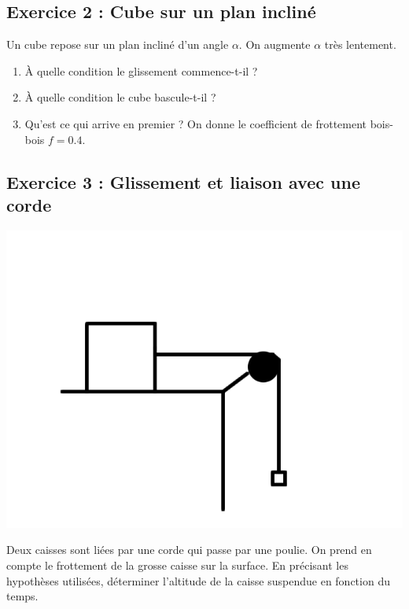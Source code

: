 \subsection{Exercice 2 : Cube sur un plan incliné}

Un cube repose sur un plan incliné d'un angle $\alpha$. On augmente $\alpha$ très lentement.

\begin{enumerate}
	\item À quelle condition le glissement commence-t-il ?
	\item À quelle condition le cube bascule-t-il ?
	\item Qu'est ce qui arrive en premier ? On donne le coefficient de frottement bois-bois $f = 0.4$.
\end{enumerate}

\subsection{Exercice 3 : Glissement et liaison avec une corde}

\begin{minipage}[c]{\linewidth/2}
	\includegraphics{./Images/mp_s05_ex03.png}
\end{minipage}%
\begin{minipage}[c]{\linewidth/2}
	Deux caisses sont liées par une corde qui passe par une poulie. On prend en compte le frottement de la grosse caisse sur la surface. En précisant les hypothèses utilisées, déterminer l'altitude de la caisse suspendue en fonction du temps.
\end{minipage}


